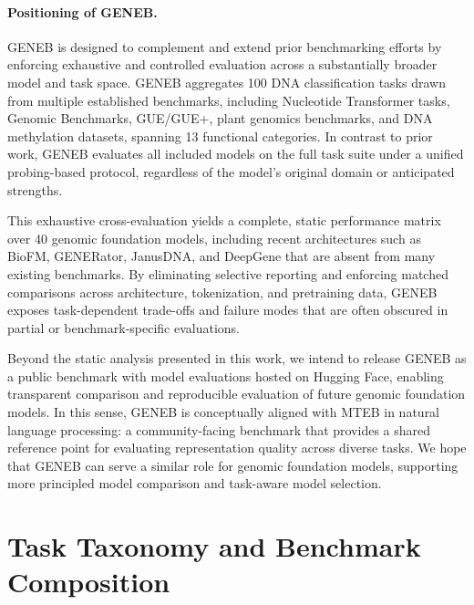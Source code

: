 \documentclass{article}
\theoremstyle{plain}
\theoremstyle{definition}
\theoremstyle{remark}
\begin{document}
\paragraph{Positioning of GENEB.}
GENEB is designed to complement and extend prior benchmarking efforts by enforcing exhaustive and controlled evaluation across a substantially broader model and task space. GENEB aggregates 100 DNA classification tasks drawn from multiple established benchmarks, including Nucleotide Transformer tasks, Genomic Benchmarks, GUE/GUE+, plant genomics benchmarks, and DNA methylation datasets, spanning 13 functional categories. In contrast to prior work, GENEB evaluates all included models on the full task suite under a unified probing-based protocol, regardless of the model’s original domain or anticipated strengths.

This exhaustive cross-evaluation yields a complete, static performance matrix over 40 genomic foundation models, including recent architectures such as BioFM, GENERator, JanusDNA, and DeepGene that are absent from many existing benchmarks. By eliminating selective reporting and enforcing matched comparisons across architecture, tokenization, and pretraining data, GENEB exposes task-dependent trade-offs and failure modes that are often obscured in partial or benchmark-specific evaluations.

Beyond the static analysis presented in this work, we intend to release GENEB as a public benchmark with model evaluations hosted on Hugging Face, enabling transparent comparison and reproducible evaluation of future genomic foundation models. In this sense, GENEB is conceptually aligned with MTEB \cite{muennighoff2023mtebmassivetextembedding} in natural language processing: a community-facing benchmark that provides a shared reference point for evaluating representation quality across diverse tasks. We hope that GENEB can serve a similar role for genomic foundation models, supporting more principled model comparison and task-aware model selection.

\section{Task Taxonomy and Benchmark Composition}
\label{subsec:task_taxonomy}
\end{document}
